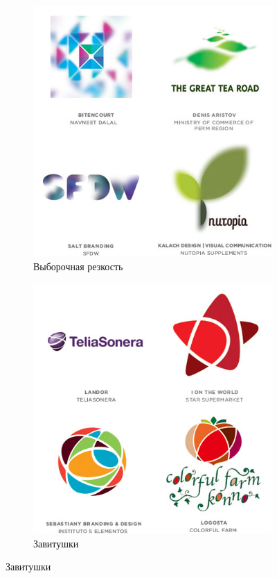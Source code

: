 \begin{figure}[h!]
  \ContinuedFloat
  \centering
  \begin{subfigure}{.45\textwidth}
    \centering
    \includegraphics[width=\linewidth]{images/supplement/logolounge/2012/Viborochnaya-rexkost'.jpeg}
    \caption{Выборочная резкость}
    \label{fig:logolounge:2012:viborichnaya-rexkost'}
  \end{subfigure}
  \hfill
  \centering
  \begin{subfigure}{.45\textwidth}
    \centering
    \includegraphics[width=\linewidth]{images/supplement/logolounge/2012/Zavitushki}
    \caption{Завитушки}
    \label{fig:logolounge:2012:zavitushki}
  \end{subfigure}


\end{figure}
